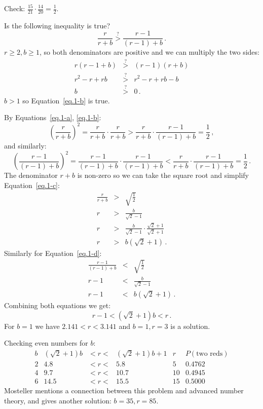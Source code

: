 Check: $\frac{15}{21}\cdot\frac{14}{20}=\frac{1}{2}$.


Is the following inequality is true?
\begin{equation}\label{eq.1-b}
\frac{r}{r+b} \stackrel{?}{>} \frac{r-1}{(r-1)+b}\,.
\end{equation}
$r\geq 2, b\geq 1$, so both denominators are positive and we can multiply the two sides:
\begin{eqnarray*}
r(r-1+b)&\stackrel{?}{>}&(r-1)(r+b)\\
r^2-r+rb&\stackrel{?}{>}&r^2-r+rb-b\\
b&\stackrel{?}{>}&0\,.
\end{eqnarray*}
$b>1$ so Equation~\ref{eq.1-b} is true.

By Equations~\ref{eq.1-a}, \ref{eq.1-b}:
\begin{equation}\label{eq.1-c}
\left(\frac{r}{r+b}\right)^2 = \frac{r}{r+b} \cdot\frac{r}{r+b} > \frac{r}{r+b} \cdot \frac{r-1}{(r-1)+b} = \frac{1}{2}\,,
\end{equation}
and similarly:
\begin{equation}\label{eq.1-d}
\left(\frac{r-1}{(r-1)+b}\right)^2  = \frac{r-1}{(r-1)+b}\cdot \frac{r-1}{(r-1)+b}<  \frac{r}{r+b} \cdot \frac{r-1}{(r-1)+b} = \frac{1}{2}\,.
\end{equation}
The denominator $r+b$ is non-zero so we can take the square root and simplify Equation~\ref{eq.1-c}:
\begin{eqnarray*}
\frac{r}{r+b}  &>& \sqrt{\frac{1}{2}}\\
r&>&\frac{b}{\sqrt{2}-1}\\
r&>&\frac{b}{\sqrt{2}-1}\cdot\frac{\sqrt{2}+1}{\sqrt{2}+1}\\
r&>&b(\sqrt{2}+1)\,.
\end{eqnarray*}
Similarly for Equation~\ref{eq.1-d}:
\begin{eqnarray*}
\frac{r-1}{(r-1)+b}&<&\sqrt{\frac{1}{2}}\\
r-1 &<& \frac{b}{\sqrt{2}-1}\\
r-1&<&b(\sqrt{2}+1)\,.
\end{eqnarray*}
Combining both equations we get:
\begin{equation}\label{eq.inequalities}
r-1<(\sqrt{2}+1)b<r\,.
\end{equation}
For $b=1$ we have $2.141 < r< 3.141$ and $b=1,r=3$ is a solution.

 Checking even numbers for $b$:
\begin{displaymath}	
\renewcommand{\arraystretch}{1}
\begin{array}{r|ccc|c|c}
b& (\sqrt{2}+1)b&<r<& (\sqrt{2}+1)b+1&r&P(\textrm{two reds})\\
\hline
2&4.8&<r<&5.8&5&0.4762\\
4&9.7&<r<&10.7&10&0.4945\\
6&14.5&<r<&15.5&
15&0.5000
\end{array}
\end{displaymath}
Mosteller mentions a connection between this problem and advanced number theory, and gives another solution: $b=35,r=85$.

